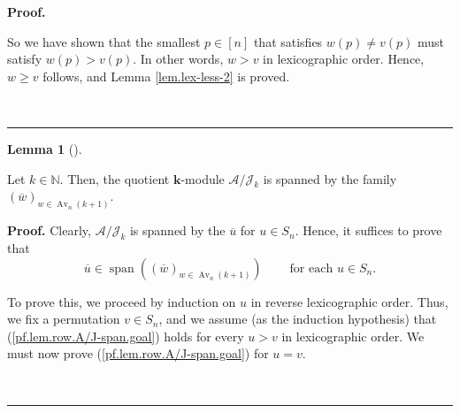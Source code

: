 \documentclass[numbers=enddot,12pt,final,onecolumn,notitlepage]{scrartcl}%
\numberwithin{exer}{subsection}
\theoremstyle{definition}
\newtheorem{lem}[theo]{Lemma}
\newenvironment{lemma}[1][]
{\begin{lem}[#1]\begin{leftbar}}
{\end{leftbar}\end{lem}}
\newenvironment{fineprint}{\medskip \begin{small}}{\end{small} \medskip}
\newenvironment{proof}[1][Proof]{\noindent\textbf{#1.} }{\ \rule{0.5em}{0.5em}}
\begin{document}
\begin{proof}
\begin{fineprint}
So we have shown that the smallest $p\in\left[  n\right]  $ that satisfies
$w\left(  p\right)  \neq v\left(  p\right)  $ must satisfy $w\left(  p\right)
>v\left(  p\right)  $. In other words, $w>v$ in lexicographic order. Hence,
$w\geq v$ follows, and Lemma \ref{lem.lex-less-2} is proved.
\end{fineprint}
\end{proof}

\begin{lemma}
\label{lem.row.A/J-span}Let $k\in\mathbb{N}$. Then, the quotient $\mathbf{k}%
$-module $\mathcal{A}/\mathcal{J}_{k}$ is spanned by the family $\left(
\overline{w}\right)  _{w\in\operatorname*{Av}\nolimits_{n}\left(  k+1\right)
}$.
\end{lemma}

\begin{proof}
Clearly, $\mathcal{A}/\mathcal{J}_{k}$ is spanned by the $\overline{u}$ for
$u\in S_{n}$. Hence, it suffices to prove that
\begin{equation}
\overline{u}\in\operatorname*{span}\left(  \left(  \overline{w}\right)
_{w\in\operatorname*{Av}\nolimits_{n}\left(  k+1\right)  }\right)
\ \ \ \ \ \ \ \ \ \ \text{for each }u\in S_{n}.
\label{pf.lem.row.A/J-span.goal}%
\end{equation}


To prove this, we proceed by induction on $u$ in reverse lexicographic order.
Thus, we fix a permutation $v\in S_{n}$, and we assume (as the induction
hypothesis) that (\ref{pf.lem.row.A/J-span.goal}) holds for every $u>v$ in
lexicographic order. We must now prove (\ref{pf.lem.row.A/J-span.goal}) for
$u=v$.


\end{proof}
\end{document}
